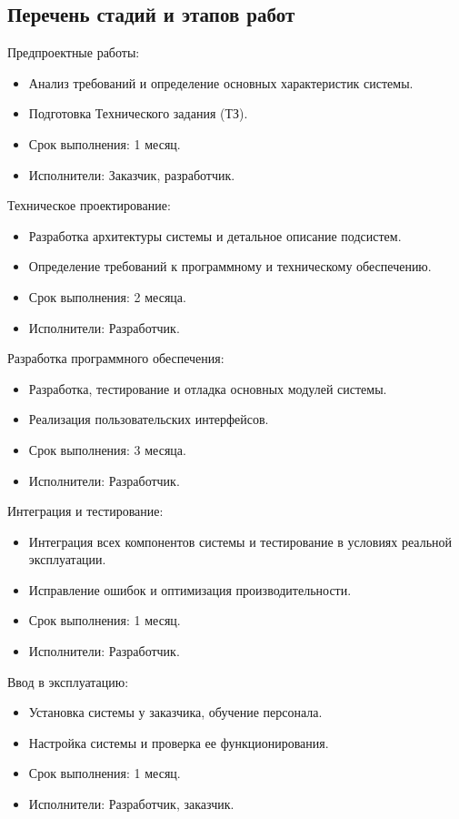 \subsection{Перечень стадий и этапов работ}
\noindent Предпроектные работы:
\begin{itemize}
    \item Анализ требований и определение основных характеристик системы.
    \item Подготовка Технического задания (ТЗ).
    \item Срок выполнения: 1 месяц.
    \item Исполнители: Заказчик, разработчик.
\end{itemize}

\noindent Техническое проектирование:
\begin{itemize}
    \item Разработка архитектуры системы и детальное описание подсистем.
    \item Определение требований к программному и техническому обеспечению.
    \item Срок выполнения: 2 месяца.
    \item Исполнители: Разработчик.
\end{itemize}

\noindent Разработка программного обеспечения:
\begin{itemize}
    \item Разработка, тестирование и отладка основных модулей системы.
    \item Реализация пользовательских интерфейсов.
    \item Срок выполнения: 3 месяца.
    \item Исполнители: Разработчик.
\end{itemize}

\noindent Интеграция и тестирование:
\begin{itemize}
    \item Интеграция всех компонентов системы и тестирование в условиях реальной эксплуатации.
    \item Исправление ошибок и оптимизация производительности.
    \item Срок выполнения: 1 месяц.
    \item Исполнители: Разработчик.
\end{itemize}

\noindent Ввод в эксплуатацию:
\begin{itemize}
    \item Установка системы у заказчика, обучение персонала.
    \item Настройка системы и проверка ее функционирования.
    \item Срок выполнения: 1 месяц.
    \item Исполнители: Разработчик, заказчик.
\end{itemize}

